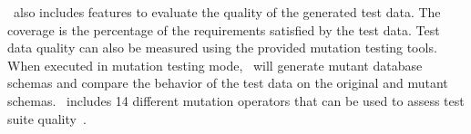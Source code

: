 \sa~also includes features to evaluate the quality of the generated test data. The coverage is the percentage of the
requirements satisfied by the test data.  Test data quality can also be measured using the provided mutation testing
tools. When executed in mutation testing mode, \sa~will generate mutant database schemas and compare the behavior of the
test data on the original and mutant schemas. \sa~includes 14 different mutation operators that can be used to assess
test suite quality~\cite{wright2015mutation}.


